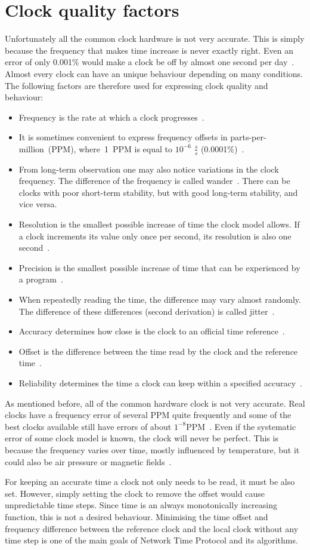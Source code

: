 \section{Clock quality factors}
Unfortunately all the common clock hardware is not very accurate.
This is simply because the frequency that makes time increase is never exactly right.
Even an error of only 0.001\% would make a clock be off by almost one second per day~\cite{ntp-faq}.
Almost every clock can have an unique behaviour depending on many conditions.
The following factors are therefore used for expressing clock quality and behaviour:
\begin{itemize}
\item
Frequency is the rate at which a clock progresses~\cite{thesis-sync}.
\item
It is sometimes convenient
to express frequency offsets in parts-per-million~(PPM), where~1~PPM
is equal to $10^{-6}$ $\frac{s}{s}$ (0.0001\%)~\cite{rfc5905}.
\item
From long-term observation one may also notice variations in the clock frequency.
The difference of the frequency is called wander~\cite{ntp-faq}.
There can be clocks with poor short-term stability, but with good long-term stability, and vice versa.
\item
Resolution is the smallest possible increase of time the clock model allows.
If a clock increments its value only once per second, its resolution is also one second~\cite{ntp-faq}.
\item
Precision is the smallest possible increase of time that can be experienced
by a program~\cite{ntp-faq}.
\item
When repeatedly reading the time, the difference may vary almost randomly.
The difference of these differences (second derivation) is called jitter~\cite{ntp-faq}.
\item
Accuracy determines how close is the clock to an official time reference~\cite{ntp-faq}.
\item
Offset is the difference between the time read by the clock and the reference time~\cite{thesis-sync}.
\item
Reliability determines the time a clock can keep within a specified accuracy~\cite{ntp-faq}.
\end{itemize}

As mentioned before, all of the common hardware clock is not very accurate.
Real clocks have a frequency error of several PPM quite frequently
and some of the best clocks available still have errors of about $1^{-8}$PPM~\cite{ntp-faq}.
Even if the systematic error of some clock model is known, the clock will never be perfect.
This is because the frequency varies over time, mostly influenced by temperature,
but it could also be air pressure or magnetic fields~\cite{ntp-faq}.

For keeping an accurate time a clock not only needs to be read, it must be also set.
However, simply setting the clock to remove the offset would cause unpredictable time steps.
Since time is an always monotonically increasing function, this is not a desired behaviour.
Minimising the time offset and frequency difference between
the reference clock and the local clock without any time step
is one of the main goals of Network Time Protocol and its algorithms.
